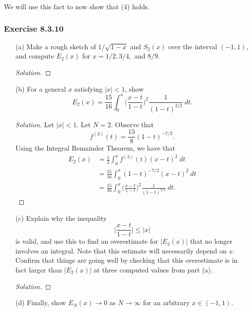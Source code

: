 We will use this fact to now show that (4) holds.

\subsubsection{Exercise 8.3.10} 
\begin{enumerate}
    \item[(a)] Make a rough sketch of \( 1 / \sqrt{ 1 -x  }  \) and \( S_{2}(x)  \) over the interval \( (-1,1)  \), and compute \( E_{2}(x)  \) for \( x = 1/2 , 3/4 ,  \) and \( 8/9  \).
        \begin{proof}[Solution]
        
        \end{proof}
    \item[(b)] For a general \( x  \) satisfying \(  |  x  |  < 1  \), show 
        \[  E_{2}(x) = \frac{ 15 }{ 16  }  \int_{ 0 }^{ x  }  \Big( \frac{ x - t  }{ 1 - t  }  \Big)^{2} \frac{ 1 }{ (1-t)^{3/2 } }  \ dt. \]
        \begin{proof}[Solution]
        Let \( |  x  |  < 1  \). Let \( N = 2  \). Observe that 
        \[  f^{(3)}(t) = \frac{ 15 }{ 8  }  (1- t )^{-7/2}.\] Using the Integral Remainder Theorem, we have that 
        \begin{align*}
            E_{2}(x) &= \frac{ 1 }{ 2 } \int_{ 0 }^{ x }  f^{(3)}(t) (x-t)^{2} \  dt   \\
                     &= \frac{ 15 }{ 16 } \int_{ 0 }^{ x }  (1-t)^{-7/2} (x - t )^{2} \  dt \\
                     &= \frac{ 15 }{ 16 }  \int_{ 0 }^{ x  }  \Big( \frac{ x - t  }{ 1 - t  }  \Big)^{2} \frac{ 1 }{ (1-t)^{3/2 } }  \  dt.
        \end{align*}
        \end{proof}
    \item[(c)] Explain why the inequality 
        \[  \Big| \frac{ x - t  }{ 1 -t  }  \Big|  \leq | x  |  \]
        is valid, and use this to find an overestimate for \( | E_{2}(x)  |   \) that no longer involves an integral. Note that this estimate will necessarily depend on \( x  \). Confirm that things are going well by checking that this overestimate is in fact larger than \( | E_{2}(x)  |  \) at three computed values from part (a).
        \begin{proof}[Solution]
        
        \end{proof}
    \item[(d)] Finally, show \( E_{N}(x) \to 0  \) as \( N \to \infty  \) for an arbitrary \( x \in (-1 , 1) \).
\end{enumerate}


